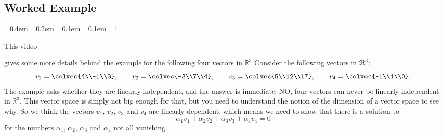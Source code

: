 
\subsection*{Worked Example}

{\ttfamily
{}\font=0.4em
\font=0.2em
\font=0.1em
\font=0.1em
\hyphenchar\font=`\-


\hypertarget{linear_independence_example}{This video} gives some more details behind the example for the following four vectors in ${\mathbb R}^3$
Consider the following vectors in \(\Re^3\):
\[
v_1=\colvec{4\\-1\\3}, \qquad
v_2=\colvec{-3\\7\\4}, \qquad
v_3=\colvec{5\\12\\17}, \qquad
v_4=\colvec{-1\\1\\0}.
\]
The example asks whether they are linearly independent, and the answer is immediate: NO, four vectors can never be linearly independent in ${\mathbb R}^3$. This vector space is simply not big enough for that, but you need to understand the notion of the dimension of a vector space to see why.
So we think the vectors $v_1$, $v_2$, $v_3$ and $v_4$ are linearly dependent, which means we need to show that there is a solution to 
\[
\alpha_1 v_1 + \alpha_2 v_2 + \alpha_3 v_3 + \alpha_4 v_4 = 0
\]
for the numbers $\alpha_1$, $\alpha_2$, $\alpha_3$ and $\alpha_4$  not all vanishing. 

}
